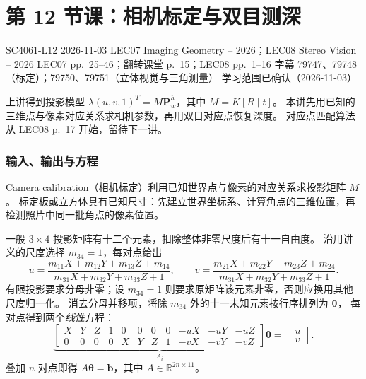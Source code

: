 
\section{第 12 节课：相机标定与双目测深}
\label{lecture:SC4061-L12}

\lecturemeta
  {SC4061-L12}
  {2026-11-03}
  {LEC07 Imaging Geometry -- 2026；LEC08 Stereo Vision -- 2026}
  {LEC07 pp.~25--46；翻转课堂 p.~15；LEC08 pp.~1--16}
  {字幕 79747、79748（标定）；79750、79751（立体视觉与三角测量）}
  {学习范围已确认（2026-11-03）}

上讲得到投影模型 $\lambda(u,v,1)^T=M\bm P_w^h$，其中 $M=K[R\mid t]$。
本讲先用已知的三维点与像素对应关系求相机参数，再用双目对应点恢复深度。
对应点匹配算法从 LEC08 p.~17 开始，留待下一讲。


\subsubsection*{输入、输出与方程}

Camera calibration（相机标定）利用已知世界点与像素的对应关系求投影矩阵 $M$。
标定板或立方体具有已知尺寸：先建立世界坐标系、计算角点的三维位置，再检测照片中同一批角点的像素位置。

一般 $3\times4$ 投影矩阵有十二个元素，扣除整体非零尺度后有十一自由度。
沿用讲义的尺度选择 $m_{34}=1$，每对点给出
\[
  u=\frac{m_{11}X+m_{12}Y+m_{13}Z+m_{14}}{m_{31}X+m_{32}Y+m_{33}Z+1},
  \qquad
  v=\frac{m_{21}X+m_{22}Y+m_{23}Z+m_{24}}{m_{31}X+m_{32}Y+m_{33}Z+1}.
\]
有限投影要求分母非零；设 $m_{34}=1$ 则要求原矩阵该元素非零，否则应换用其他尺度归一化。
消去分母并移项，将除 $m_{34}$ 外的十一未知元素按行序排列为 $\bm\theta$，
每对点得到两个\emph{线性}方程：
\[
  \underbrace{\left[\begin{array}{*{11}{r}}
    X&Y&Z&1&0&0&0&0&-uX&-uY&-uZ\\
    0&0&0&0&X&Y&Z&1&-vX&-vY&-vZ
  \end{array}\right]}_{A_i}\bm\theta
  =\begin{bmatrix}u\\v\end{bmatrix}.
\]
叠加 $n$ 对点即得 $A\bm\theta=\bm b$，其中 $A\in\mathbb R^{2n\times11}$。


